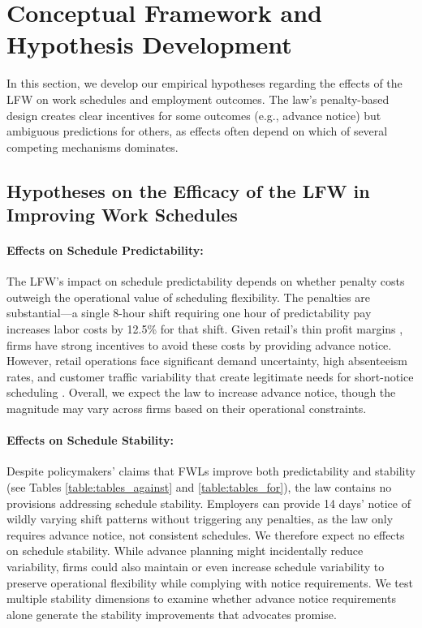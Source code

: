 \documentclass[letterpaper,11pt,leqno]{article}
\theoremstyle{paper}
\begin{document}
\section{Conceptual Framework and Hypothesis Development} \label{sec:hyp}

In this section, we develop our empirical hypotheses regarding the effects of the LFW on work schedules and employment outcomes. The law's penalty-based design creates clear incentives for some outcomes (e.g., advance notice) but ambiguous predictions for others, as effects often depend on which of several competing mechanisms dominates.


\subsection{Hypotheses on the Efficacy of the LFW in Improving Work Schedules}

\paragraph{Effects on Schedule Predictability:}
The LFW's impact on schedule predictability depends on whether penalty costs outweigh the operational value of scheduling flexibility. The penalties are substantial—a single 8-hour shift requiring one hour of predictability pay increases labor costs by 12.5\% for that shift. Given retail's thin profit margins \citep{fisher_raman_2010}, firms have strong incentives to avoid these costs by providing advance notice. However, retail operations face significant demand uncertainty, high absenteeism rates, and customer traffic variability that create legitimate needs for short-notice scheduling \citep{netessine_traffic,kesavan_traffic,kwon_late}. Overall, we expect the law to increase advance notice, though the magnitude may vary across firms based on their operational constraints.

\paragraph{Effects on Schedule Stability:}
Despite policymakers' claims that FWLs improve both predictability and stability (see Tables \ref{table:tables_against} and \ref{table:tables_for}), the law contains no provisions addressing schedule stability. Employers can provide 14 days' notice of wildly varying shift patterns without triggering any penalties, as the law only requires advance notice, not consistent schedules. We therefore expect no effects on schedule stability. While advance planning might incidentally reduce variability, firms could also maintain or even increase schedule variability to preserve operational flexibility while complying with notice requirements. We test multiple stability dimensions to examine whether advance notice requirements alone generate the stability improvements that advocates promise.
\end{document}
